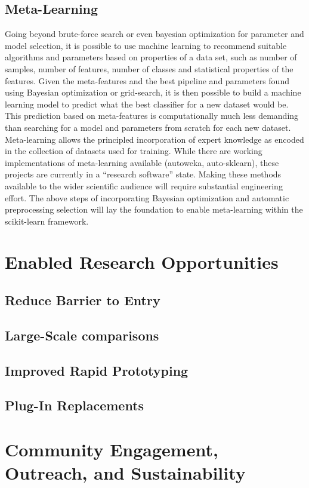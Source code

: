 \subsection{Meta-Learning}
Going beyond brute-force search or even bayesian optimization for parameter and
model selection, it is possible to use machine learning to recommend suitable
algorithms and parameters based on properties of a data set, such as number of
samples, number of features, number of classes and statistical properties of
the features. 
Given the meta-features and the best pipeline and parameters found using
Bayesian optimization or grid-search, it is then possible to build a machine
learning model to predict what the best classifier for a new dataset would be.
This prediction based on meta-features is computationally much less demanding
than searching for a model and parameters from scratch for each new dataset.
Meta-learning allows the principled incorporation of expert knowledge as encoded
in the collection of datasets used for training.
While there are working implementations of meta-learning available (autoweka, auto-sklearn),
these projects are currently in a ``research software'' state. Making these methods
available to the wider scientific audience will require substantial engineering
effort. The above steps of incorporating Bayesian optimization and automatic
preprocessing selection will lay the foundation to enable meta-learning within the
scikit-learn framework.

\section{Enabled Research Opportunities}
\subsection{Reduce Barrier to Entry}
\subsection{Large-Scale comparisons}
\subsection{Improved Rapid Prototyping}
\subsection{Plug-In Replacements}


\section{Community Engagement, Outreach, and Sustainability}
